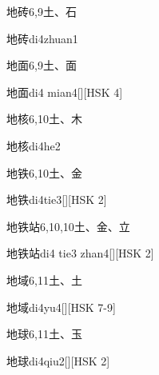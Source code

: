 \begin{Entry}{地砖}{6,9}{⼟、⽯}
  \begin{Phonetics}{地砖}{di4zhuan1}
  \end{Phonetics}
\end{Entry}

\begin{Entry}{地面}{6,9}{⼟、⾯}
  \begin{Phonetics}{地面}{di4 mian4}[][HSK 4]
  \end{Phonetics}
\end{Entry}

\begin{Entry}{地核}{6,10}{⼟、⽊}
  \begin{Phonetics}{地核}{di4he2}
  \end{Phonetics}
\end{Entry}

\begin{Entry}{地铁}{6,10}{⼟、⾦}
  \begin{Phonetics}{地铁}{di4tie3}[][HSK 2]
  \end{Phonetics}
\end{Entry}

\begin{Entry}{地铁站}{6,10,10}{⼟、⾦、⽴}
  \begin{Phonetics}{地铁站}{di4 tie3 zhan4}[][HSK 2]
  \end{Phonetics}
\end{Entry}

\begin{Entry}{地域}{6,11}{⼟、⼟}
  \begin{Phonetics}{地域}{di4yu4}[][HSK 7-9]
  \end{Phonetics}
\end{Entry}

\begin{Entry}{地球}{6,11}{⼟、⽟}
  \begin{Phonetics}{地球}{di4qiu2}[][HSK 2]
  \end{Phonetics}
\end{Entry}

